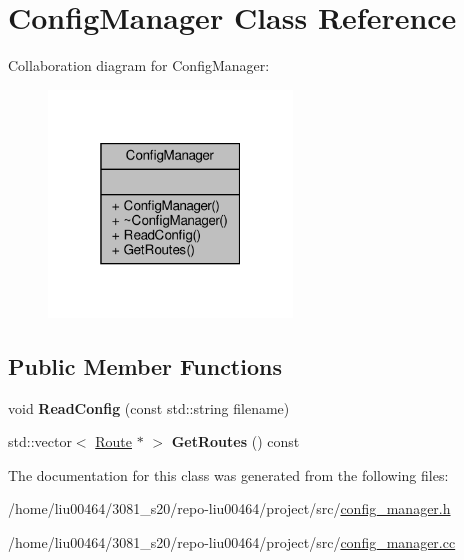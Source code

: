 \hypertarget{classConfigManager}{}\section{Config\+Manager Class Reference}
\label{classConfigManager}


Collaboration diagram for Config\+Manager\+:\nopagebreak
\begin{figure}[H]
\begin{center}
\leavevmode
\includegraphics[width=184pt]{classConfigManager__coll__graph}
\end{center}
\end{figure}
\subsection*{Public Member Functions}
\begin{DoxyCompactItemize}
\item 
\mbox{\label{classConfigManager_ab8087a9f44ddaa001ea361b56514e64a}} 
void {\bfseries Read\+Config} (const std\+::string filename)
\item 
\mbox{\label{classConfigManager_a0db6329b7dd5ac1f92ee262c30df4ef9}} 
std\+::vector$<$ \hyperlink{classRoute}{Route} $\ast$ $>$ {\bfseries Get\+Routes} () const
\end{DoxyCompactItemize}


The documentation for this class was generated from the following files\+:\begin{DoxyCompactItemize}
\item 
/home/liu00464/3081\+\_\+s20/repo-\/liu00464/project/src/\hyperlink{config__manager_8h}{config\+\_\+manager.\+h}\item 
/home/liu00464/3081\+\_\+s20/repo-\/liu00464/project/src/\hyperlink{config__manager_8cc}{config\+\_\+manager.\+cc}\end{DoxyCompactItemize}
